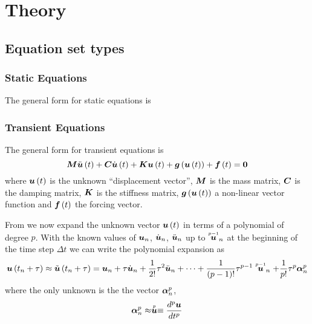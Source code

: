 \clearemptydoublepage
\chapter{Theory}
\label{cha:theory}

\section{Equation set types}

\subsection{Static Equations}

The general form for static equations is

\subsection{Transient Equations}

The general form for transient equations is
\begin{equation}
  \matr{M}\fnof{\ddot{\vect{u}}}{t}+\matr{C}\fnof{\dot{\vect{u}}}{t}+\matr{K}\fnof{\vect{u}}{t}+
  \fnof{\vect{g}}{\fnof{\vect{u}}{t}}+\fnof{\vect{f}}{t}=\vect{0}
  \label{eqn:generaltransientnonlinear}
\end{equation}
where $\fnof{\vect{u}}{t}$ is the unknown ``displacement vector'', $\matr{M}$
is the mass matrix, $\matr{C}$ is the damping matrix, $\matr{K}$ is the
stiffness matrix, $\fnof{\vect{g}}{\fnof{\vect{u}}{t}}$ a non-linear vector
function and $\fnof{\vect{f}}{t}$ the forcing vector.

From \cite{zienkiewicz:2006_1} we now expand the unknown vector $\fnof{\vect{u}}{t}$ in terms of a polynomial of degree
$p$. With the known values of $\vect{u}_{n}$, $\dot{\vect{u}}_{n}$,
$\ddot{\vect{u}}_{n}$ up to $\symover{p-1}{\vect{u}}_{n}$ at the beginning of
the time step $\Delta t$ we can write the polynomial expansion as
\begin{equation}
  \fnof{\vect{u}}{t_{n}+\tau}\approx\fnof{\tilde{\vect{u}}}{t_{n}+\tau}=\vect{u}_{n}+\tau\dot{\vect{u}}_{n}+
  \frac{1}{2!}\tau^{2}\ddot{\vect{u}}_{n}+\cdots+\dfrac{1}{\factorial{p-1}}\tau^{p-1}\symover{p-1}{\vect{u}}_{n}+
  \dfrac{1}{p!}\tau^{p}\vect{\alpha}^{p}_{n}
  \label{eqn:timepolyexpansion}
\end{equation}
where the only unknown is the the vector $\vect{\alpha}^{p}_{n}$,
\begin{equation}
  \vect{\alpha}^{p}_{n}\approx\symover{p}{\vect{u}}\equiv\dnby{p}{\vect{u}}{t}
\end{equation}

